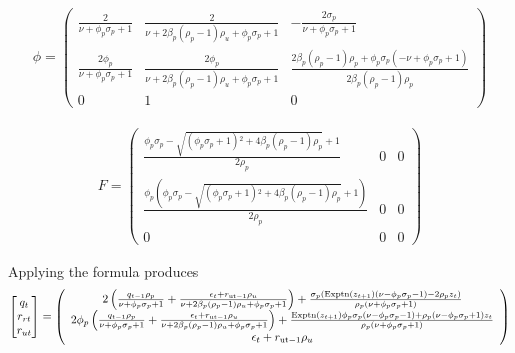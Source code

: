 \documentclass[12pt]{article}
\begin{document}
\begin{gather*}
  \phi=   \left(
   \begin{array}{ccc}
    \frac{2}{\nu +\phi _p \sigma _p+1} & \frac{2}{\nu +2 \beta _p \left(\rho
      _p-1\right) \rho _u+\phi _p \sigma _p+1} & -\frac{2 \sigma _p}{\nu +\phi
      _p \sigma _p+1} \\
    \frac{2 \phi _p}{\nu +\phi _p \sigma _p+1} & \frac{2 \phi _p}{\nu +2 \beta
      _p \left(\rho _p-1\right) \rho _u+\phi _p \sigma _p+1} & \frac{2 \beta
      _p \left(\rho _p-1\right) \rho _p+\phi _p \sigma _p \left(-\nu +\phi _p
      \sigma _p+1\right)}{2 \beta _p \left(\rho _p-1\right) \rho _p} \\
    0 & 1 & 0
   \end{array}
   \right)
\end{gather*}

\begin{gather*}
  F=    \left(
   \begin{array}{ccc}
    \frac{\phi _p \sigma _p-\sqrt{\left(\phi _p \sigma _p+1\right){}^2+4 \beta
      _p \left(\rho _p-1\right) \rho _p}+1}{2 \rho _p} & 0 & 0 \\
    \frac{\phi _p \left(\phi _p \sigma _p-\sqrt{\left(\phi _p \sigma
      _p+1\right){}^2+4 \beta _p \left(\rho _p-1\right) \rho _p}+1\right)}{2
      \rho _p} & 0 & 0 \\
    0 & 0 & 0
   \end{array}
   \right)
\end{gather*}

Applying the formula produces
\begin{gather*}
\begin{bmatrix} q_t\\r_{rt}\\r_{ut} \end{bmatrix}=      \left(
   \begin{array}{c}
    2 \left(\frac{q_{t-1} \rho _p}{\nu +\phi _p \sigma _p+1}+\frac{\epsilon
      _t+r_{\text{ut}-1} \rho _u}{\nu +2 \beta _p \left(\rho _p-1\right) \rho
      _u+\phi _p \sigma _p+1}\right)+\frac{\sigma _p
      \left(\text{Exptn}\left(z_{t+1}\right) \left(\nu -\phi _p \sigma
      _p-1\right)-2 \rho _p z_t\right)}{\rho _p \left(\nu +\phi _p \sigma
      _p+1\right)} \\
    2 \phi _p \left(\frac{q_{t-1} \rho _p}{\nu +\phi _p \sigma
      _p+1}+\frac{\epsilon _t+r_{\text{ut}-1} \rho _u}{\nu +2 \beta _p
      \left(\rho _p-1\right) \rho _u+\phi _p \sigma
      _p+1}\right)+\frac{\text{Exptn}\left(z_{t+1}\right) \phi _p \sigma _p
      \left(\nu -\phi _p \sigma _p-1\right)+\rho _p \left(\nu -\phi _p \sigma
      _p+1\right) z_t}{\rho _p \left(\nu +\phi _p \sigma _p+1\right)} \\
    \epsilon _t+r_{\text{ut}-1} \rho _u
   \end{array}
   \right)
\end{gather*}
\end{document}
